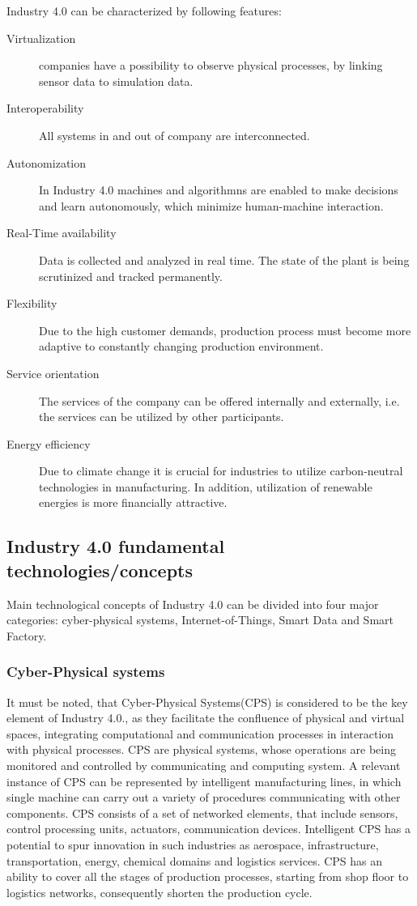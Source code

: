 \documentclass[thesis=B,english]{FITthesis}[2019/12/23]
\begin{document}
Industry 4.0 can be characterized by following features:
\begin{description}
\item[Virtualization] companies have a possibility to observe physical processes, by linking sensor data to simulation data.
\item[Interoperability] All systems in and out of company are interconnected.
\item[Autonomization] In Industry 4.0 machines and algorithmns are enabled to make decisions and learn autonomously, which minimize human-machine interaction.
\item[Real-Time availability] Data is collected and analyzed in real time. The state of the plant is being scrutinized and tracked permanently.
\item[Flexibility] Due to the high customer demands, production process must become more adaptive to constantly changing production environment. 
\item[Service orientation] The services of the company can be offered internally and externally, i.e. the services can be utilized by other participants.
\item[Energy efficiency] Due to climate change it is crucial for industries to utilize carbon-neutral technologies in manufacturing. In addition, utilization of renewable energies is more financially attractive.
\end{description}


\subsection{Industry 4.0 fundamental technologies/concepts}

Main technological concepts of Industry 4.0 can be divided into four major categories: cyber-physical systems, Internet-of-Things, Smart Data and Smart Factory. 

\subsubsection{Cyber-Physical systems}

It must be noted, that  Cyber-Physical Systems(CPS) is considered to be the key element of Industry 4.0., as they facilitate the confluence of physical and virtual spaces, integrating computational and communication processes in interaction with physical processes. CPS are physical systems, whose operations are being monitored and controlled by communicating and computing system. A relevant instance of CPS can be represented by intelligent manufacturing lines, in which single machine can carry out a variety of procedures communicating with other components. CPS consists of a set of networked elements, that include sensors, control processing units, actuators, communication devices. Intelligent CPS has a potential to spur innovation in such industries as aerospace, infrastructure, transportation, energy, chemical domains and logistics services. CPS has an ability to cover all the stages of production processes, starting from shop floor to logistics networks, consequently shorten the production cycle. 
\end{document}
